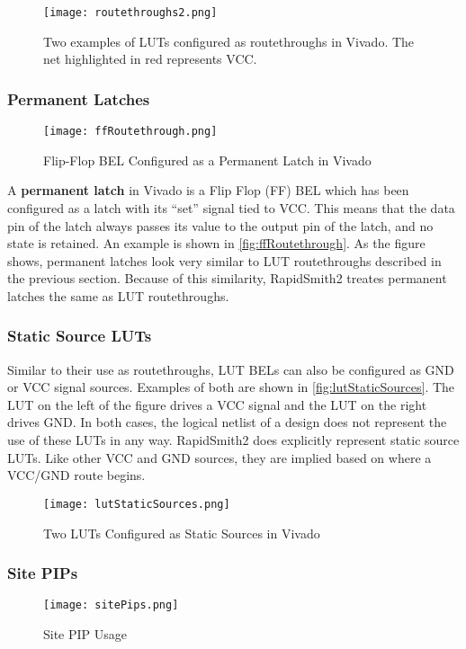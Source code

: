 \begin{figure}[h]
  \centering
  \texttt{[image: routethroughs2.png]}
  \caption{Two examples of LUTs configured as routethroughs in Vivado. The net
  highlighted in red represents VCC.}
  \label{fig:routethroughs}
\end{figure}

\subsubsection {Permanent Latches}

\begin{figure}[b!]
  \centering
  \texttt{[image: ffRoutethrough.png]}
  \caption{Flip-Flop BEL Configured as a Permanent Latch in Vivado}
  \label{fig:ffRoutethrough}
\end{figure}

A \textbf{permanent latch} in Vivado is a Flip Flop (FF) BEL which has been
configured as a latch with its ``set'' signal tied to VCC. This means that the
data pin of the latch always passes its value to the output pin of the latch,
and no state is retained. An example is shown in \autoref{fig:ffRoutethrough}.
As the figure shows, permanent latches look very similar to LUT routethroughs
described in the previous section. Because of this similarity, RapidSmith2
treates permanent latches the same as LUT routethroughs.

\subsubsection{Static Source LUTs}
Similar to their use as routethroughs, LUT BELs can also be configured as GND or
VCC signal sources. Examples of both are shown in
\autoref{fig:lutStaticSources}. The LUT on the left of the figure drives a VCC
signal and the LUT on the right drives GND. In both cases, the logical
netlist of a design does not represent the use of these LUTs in any way.
RapidSmith2 does explicitly represent static source LUTs. Like other VCC and GND
sources, they are implied based on where a VCC/GND route begins.

\begin{figure}[h]
  \centering
  \texttt{[image: lutStaticSources.png]}
  \caption{Two LUTs Configured as Static Sources in Vivado}
  \label{fig:lutStaticSources}
\end{figure}

\subsubsection{Site PIPs}
\begin{figure}[b!]
  \centering
  \texttt{[image: sitePips.png]}
  \caption{Site PIP Usage}
  \label{fig:sitePips}
\end{figure}

